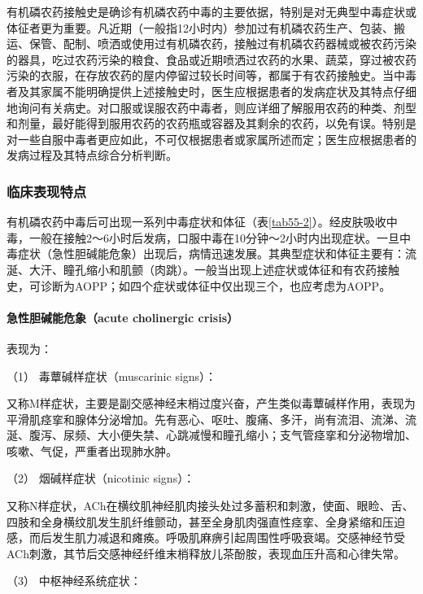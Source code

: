 有机磷农药接触史是确诊有机磷农药中毒的主要依据，特别是对无典型中毒症状或体征者更为重要。凡近期（一般指12小时内）参加过有机磷农药生产、包装、搬运、保管、配制、喷洒或使用过有机磷农药，接触过有机磷农药器械或被农药污染的器具，吃过农药污染的粮食、食品或近期喷洒过农药的水果、蔬菜，穿过被农药污染的衣服，在存放农药的屋内停留过较长时间等，都属于有农药接触史。当中毒者及其家属不能明确提供上述接触史时，医生应根据患者的发病症状及其特点仔细地询问有关病史。对口服或误服农药中毒者，则应详细了解服用农药的种类、剂型和剂量，最好能得到服用农药的农药瓶或容器及其剩余的农药，以免有误。特别是对一些自服中毒者更应如此，不可仅根据患者或家属所述而定；医生应根据患者的发病过程及其特点综合分析判断。

\subsubsection{临床表现特点}

有机磷农药中毒后可出现一系列中毒症状和体征（表\ref{tab55-2}）。经皮肤吸收中毒，一般在接触2～6小时后发病，口服中毒在10分钟～2小时内出现症状。一旦中毒症状（急性胆碱能危象）出现后，病情迅速发展。其典型症状和体征主要有：流涎、大汗、瞳孔缩小和肌颤（肉跳）。一般当出现上述症状或体征和有农药接触史，可诊断为AOPP；如四个症状或体征中仅出现三个，也应考虑为AOPP。

\paragraph{急性胆碱能危象（acute cholinergic crisis）}

表现为：

\hypertarget{text00139.htmlux5cux23CHP5-3-1-2-2-1-1}{}
（1） 毒蕈碱样症状（muscarinic signs）：

又称M样症状，主要是副交感神经末梢过度兴奋，产生类似毒蕈碱样作用，表现为平滑肌痉挛和腺体分泌增加。先有恶心、呕吐、腹痛、多汗，尚有流泪、流涕、流涎、腹泻、尿频、大小便失禁、心跳减慢和瞳孔缩小；支气管痉挛和分泌物增加、咳嗽、气促，严重者出现肺水肿。

\hypertarget{text00139.htmlux5cux23CHP5-3-1-2-2-1-2}{}
（2） 烟碱样症状（nicotinic signs）：

又称N样症状，ACh在横纹肌神经肌肉接头处过多蓄积和刺激，使面、眼睑、舌、四肢和全身横纹肌发生肌纤维颤动，甚至全身肌肉强直性痉挛、全身紧缩和压迫感，而后发生肌力减退和瘫痪。呼吸肌麻痹引起周围性呼吸衰竭。交感神经节受ACh刺激，其节后交感神经纤维末梢释放儿茶酚胺，表现血压升高和心律失常。

\hypertarget{text00139.htmlux5cux23CHP5-3-1-2-2-1-3}{}
（3） 中枢神经系统症状：

